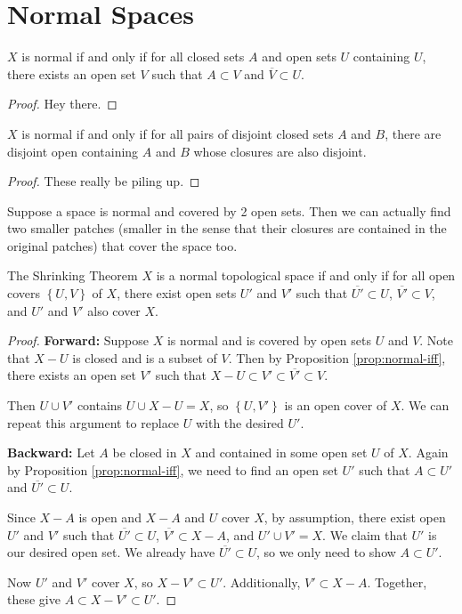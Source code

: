 \documentclass[10pt]{report}
\begin{document}

\section{Normal Spaces}

\begin{prop}
	\label{prop:normal-iff}
	$X$ is normal if and only if for all closed sets $A$ and open sets $U$ containing $U$, there exists an open set $V$ such that $A \subset V$ and $\overline{V}\subset U$.
\end{prop}
\begin{proof}
{\color{red}Hey there.}
\end{proof}

\begin{prop}
$X$ is normal if and only if for all pairs of disjoint closed sets $A$ and $B$, there are disjoint open containing $A$ and $B$ whose closures are also disjoint.
\end{prop}
\begin{proof}
{\color{red}These really be piling up.}
\end{proof}

Suppose a space is normal and covered by 2 open sets. Then we can actually find two smaller patches (smaller in the sense that their closures are contained in the original patches) that cover the space too.

\begin{thrm}{The Shrinking Theorem}{}
$X$ is a normal topological space if and only if for all open covers $\left\{ U,V \right\}$ of $X$, there exist open sets $U'$ and $V'$ such that $\overline{U'} \subset U$, $\overline{V'} \subset V$, and $U'$ and $V'$ also cover $X$.
\end{thrm}
\begin{proof}
	\textbf{Forward:} Suppose $X$ is normal and is covered by open sets $U$ and $V$. Note that $X-U$ is closed and is a subset of $V$. Then by Proposition \ref{prop:normal-iff}, there exists an open set $V'$ such that $X-U \subset V' \subset \overline{V'} \subset V.$

	Then $U \cup V'$ contains $U \cup X-U = X$, so $\left\{ U,V' \right\}$ is an open cover of $X$. We can repeat this argument to replace $U$ with the desired $U'$.

	\textbf{Backward:} Let $A$ be closed in $X$ and contained in some open set $U$ of $X$. Again by Proposition \ref{prop:normal-iff}, we need to find an open set $U'$ such that $A \subset U'$ and $\overline{U'} \subset U$.

	Since $X-A$ is open and $X-A$ and $U$ cover $X$, by assumption, there exist open $U'$ and $V'$ such that $\overline{U'} \subset U$, $\overline{V'} \subset X-A$, and $U' \cup V' = X$. We claim that $U'$ is our desired open set. We already have $\overline{U'}  \subset U$, so we only need to show $A \subset U'$.

	Now $U'$ and $V'$ cover $X$, so $X-V' \subset U'$. Additionally, $V' \subset X-A$. Together, these give $A \subset X-V' \subset U'$.
\end{proof}
\end{document}

